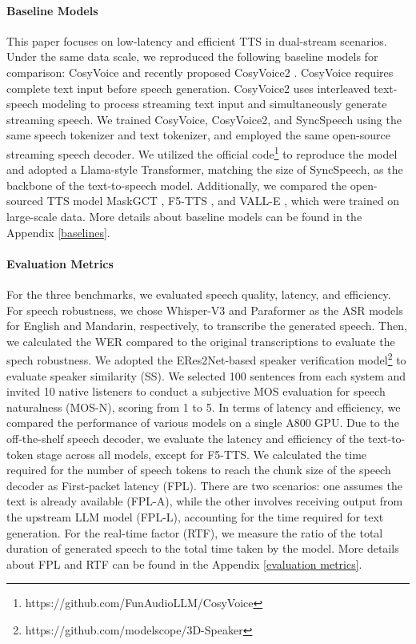 \paragraph{Baseline Models}
This paper focuses on low-latency and efficient TTS in dual-stream scenarios. Under the same data scale, we reproduced the following baseline models for comparison: CosyVoice \cite{cosyvoice} and recently proposed CosyVoice2 \cite{cosyvoice2.0}. CosyVoice requires complete text input before speech generation. 
CosyVoice2 uses interleaved text-speech modeling to process streaming text input and simultaneously generate streaming speech. We trained CosyVoice, CosyVoice2, and SyncSpeech using the same speech tokenizer and text tokenizer, and employed the same open-source streaming speech decoder. We utilized the official code\footnote{https://github.com/FunAudioLLM/CosyVoice} to reproduce the model and adopted a Llama-style Transformer, matching the size of SyncSpeech, as the backbone of the text-to-speech model.  Additionally, we compared the open-sourced TTS model MaskGCT \cite{maskgct}, F5-TTS \cite{F5tts}, and VALL-E \cite{valle}, which were trained on large-scale data.
 More details about baseline models can be found in the Appendix \ref{baselines}.


\paragraph{Evaluation Metrics} For the three benchmarks, we evaluated
speech quality, latency, and  efficiency. 
For speech robustness, we chose Whisper-V3 and Paraformer as the ASR models for English and Mandarin, respectively, to transcribe the generated speech. Then, we calculated the WER compared to the original transcriptions to evaluate the spech robustness. We adopted the ERes2Net-based \cite{eres2net} speaker verification model\footnote{https://github.com/modelscope/3D-Speaker} to evaluate speaker similarity (SS). We selected 100 sentences from each system and invited 10 native listeners to conduct a subjective MOS evaluation for speech naturalness (MOS-N), scoring from 1 to 5. 
In terms of latency and efficiency, we compared the performance of various models on a single A800 GPU. 
Due to the off-the-shelf speech decoder, we evaluate the latency and efficiency of the text-to-token stage across all models, except for F5-TTS.
We calculated the time required for the number of speech tokens to reach the chunk size of the speech decoder as First-packet latency (FPL). There are two scenarios: one assumes the text is already available (FPL-A), while the other involves receiving output from the upstream LLM model (FPL-L), accounting for the time required for text generation.
 For the real-time factor (RTF), we measure the ratio of the total duration of generated speech to the total time taken by the model. More details about FPL and RTF can be found in the Appendix \ref{evaluation metrics}.

